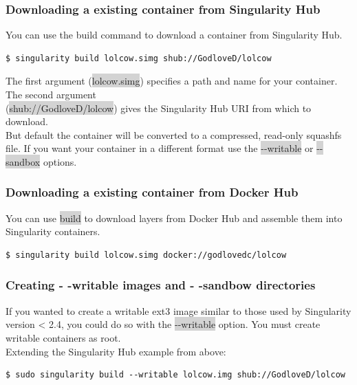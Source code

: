 \documentclass[a4paper]{article}
\newcounter{subsubsubsection}[subsubsection]
\begin{document}
\subsubsection{Downloading a existing container from Singularity Hub}
You can use the build command to download a container from Singularity Hub.

\begin{lstlisting}[frame=single]  
$ singularity build lolcow.simg shub://GodloveD/lolcow

\end{lstlisting}

The first argument (\colorbox{lightgray}{lolcow.simg}) specifies a path and name for your container. The second argument \\(\colorbox{lightgray}{shub://GodloveD/lolcow}) gives the Singularity Hub URI from which to download.\\

But default the container will be converted to a compressed, read-only squashfs file. If you want your container in a different format use the \colorbox{lightgray}{-{}-writable} or \colorbox{lightgray}{-{}-sandbox} options.


\subsubsection{Downloading a existing container from Docker Hub}

You can use \colorbox{lightgray}{build} to download layers from Docker Hub and assemble them into Singularity containers.
\begin{lstlisting}[frame=single]  
$ singularity build lolcow.simg docker://godlovedc/lolcow
\end{lstlisting}
\subsubsection{Creating - -writable images and - -sandbow directories}
	
	If you wanted to create a writable ext3 image similar to those used by Singularity version < 2.4, you could do so with the \colorbox{lightgray}{-{}-writable} option. You must create writable containers as root.
\\[0.1in]
Extending the Singularity Hub example from above:	
\begin{lstlisting}[frame=single]  
$ sudo singularity build --writable lolcow.img shub://GodloveD/lolcow
\end{lstlisting}
\end{document}
